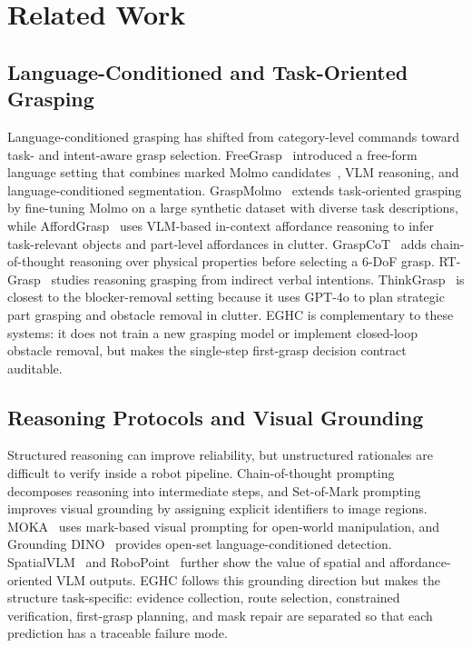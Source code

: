 \section{Related Work}

\subsection{Language-Conditioned and Task-Oriented Grasping}

Language-conditioned grasping has shifted from category-level commands toward task- and intent-aware grasp selection. FreeGrasp~\cite{freegrasp} introduced a free-form language setting that combines marked Molmo candidates~\cite{molmo}, VLM reasoning, and language-conditioned segmentation. GraspMolmo~\cite{graspmolmo} extends task-oriented grasping by fine-tuning Molmo on a large synthetic dataset with diverse task descriptions, while AffordGrasp~\cite{affordgrasp} uses VLM-based in-context affordance reasoning to infer task-relevant objects and part-level affordances in clutter. GraspCoT~\cite{graspcot} adds chain-of-thought reasoning over physical properties before selecting a 6-DoF grasp. RT-Grasp~\cite{rtgrasp} studies reasoning grasping from indirect verbal intentions. ThinkGrasp~\cite{thinkgrasp} is closest to the blocker-removal setting because it uses GPT-4o to plan strategic part grasping and obstacle removal in clutter. EGHC is complementary to these systems: it does not train a new grasping model or implement closed-loop obstacle removal, but makes the single-step first-grasp decision contract auditable.

\subsection{Reasoning Protocols and Visual Grounding}

Structured reasoning can improve reliability, but unstructured rationales are difficult to verify inside a robot pipeline. Chain-of-thought prompting~\cite{chainofthought} decomposes reasoning into intermediate steps, and Set-of-Mark prompting~\cite{setofmark} improves visual grounding by assigning explicit identifiers to image regions. MOKA~\cite{moka} uses mark-based visual prompting for open-world manipulation, and Grounding DINO~\cite{groundingdino} provides open-set language-conditioned detection. SpatialVLM~\cite{spatialvlm} and RoboPoint~\cite{robopoint} further show the value of spatial and affordance-oriented VLM outputs. EGHC follows this grounding direction but makes the structure task-specific: evidence collection, route selection, constrained verification, first-grasp planning, and mask repair are separated so that each prediction has a traceable failure mode.

